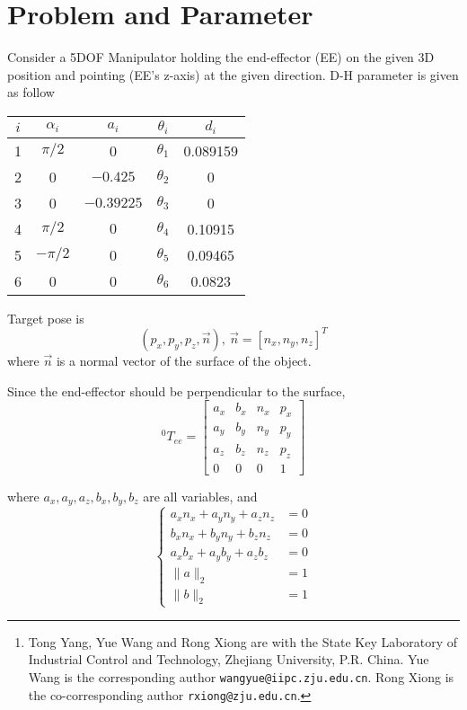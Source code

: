 \documentclass[utf8]{article}
\author{Tong Yang, Yue Wang and Rong Xiong%
\thanks{Tong Yang, Yue Wang and Rong Xiong are with the State Key Laboratory of Industrial Control and Technology, Zhejiang University, P.R. China. Yue Wang is the corresponding author {\tt\small wangyue@iipc.zju.edu.cn}. Rong Xiong is the co-corresponding author {\tt\small rxiong@zju.edu.cn}.}%
}
\begin{document}
\thispagestyle{empty}
\pagestyle{empty}



\section{Problem and Parameter}
\noindent
\indent
Consider a 5DOF Manipulator holding the end-effector (EE) on the given 3D position and pointing (EE's z-axis) at the given direction. D-H parameter is given as follow
\begin{table}[h]
\centering
\begin{tabular}{|c|c|c|c|c|}
\hline
$i$ & $\alpha_i$ & $a_i$ & $\theta_i$ & $d_i$ \\
\hline
\hline
1 & $\pi/2$ & 0 & $\theta_1$ & 0.089159 \\
\hline
2 & 0 & $-0.425$ & $\theta_2$ & 0 \\
\hline
3 & 0 & $-0.39225$ & $\theta_3$ & 0 \\
\hline
4 & $\pi/2$ & $0$ & $\theta_4$ & 0.10915 \\
\hline
5 & $-\pi/2$ & 0 & $\theta_5$ & 0.09465 \\
\hline 
6 & 0 & 0 & $\theta_6$ & 0.0823 \\
\hline
\end{tabular}

\end{table}

Target pose is 
$$(p_x, p_y, p_z, \vec{n}),\ \vec{n} = [n_x, n_y, n_z]^T$$
where $\vec{n}$ is a normal vector of the surface of the object. 

Since the end-effector should be perpendicular to the surface, 
\begin{equation}
^0T_{ee} = \left[
\begin{matrix}
a_x & b_x & n_x & p_x\\
a_y & b_y & n_y & p_y\\
a_z & b_z & n_z & p_z\\
0 & 0 & 0 & 1
\end{matrix}
\right]
\end{equation}

where $a_x, a_y, a_z, b_x, b_y, b_z$ are all variables, and
\begin{equation}\label{constraints}
\left\{
\begin{aligned}
a_xn_x + a_yn_y + a_zn_z &= 0\\
b_xn_x + b_yn_y + b_zn_z &= 0\\
a_xb_x + a_yb_y + a_zb_z &= 0\\
\parallel a\parallel_2 &= 1\\
\parallel b\parallel_2 &= 1
\end{aligned}
\right.
\end{equation}
\end{document}
